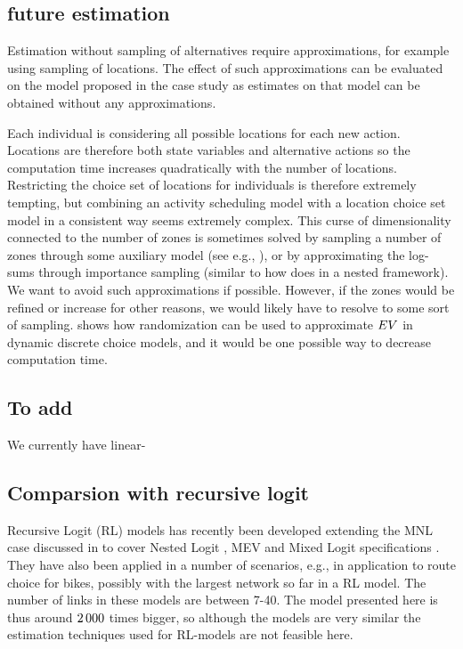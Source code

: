 \subsection{future estimation}
Estimation without sampling of alternatives require approximations, for example using sampling of locations. The effect of such approximations can be evaluated on the model proposed in the case study as estimates on that model can be obtained without any approximations. %

Each individual is considering all possible locations for each new action. Locations are therefore both state variables and alternative actions so the computation time increases quadratically with the number of locations. Restricting the choice set of locations for individuals is therefore extremely tempting, but combining an activity scheduling model with a location choice set model in a consistent way seems extremely complex. This curse of dimensionality connected to the number of zones is sometimes solved by sampling a number of zones through some auxiliary model (see e.g., \citep{liao13}), or by approximating the log-sums through importance sampling (similar to how \citealt{Bradley10} does in a nested framework). We want to avoid such approximations if possible. However, if the zones would be refined or increase for other reasons, we would likely have to resolve to some sort of sampling. \citet{Rust97} shows how randomization can be used to approximate $EV$ in dynamic discrete choice models, and it would be one possible way to decrease computation time.

\subsection{To add}

We currently have linear-


\subsection{Comparsion with recursive logit}
Recursive Logit (RL) models has recently been developed extending the MNL case discussed in \citet{fosgerau2013} to cover Nested Logit \citep{mai2015}, MEV \citep{mai2016method} and Mixed Logit specifications \citep{mai2016decomposition}. They have also been applied in a number of scenarios, e.g., in \cite{zimmermann2017bike}  application to route choice for bikes, possibly with the largest network so far in a RL model. The number of links in these models are between 7-40. The model presented here is thus around $2\, 000$ times bigger, so although the models are very similar the estimation techniques used for RL-models are not feasible here. 


